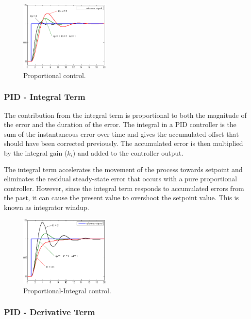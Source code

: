 \begin{figure}
\centering
\includegraphics[width=0.4\textwidth,height=\textheight]{ControlFigures/Change_with_Kp.png}
\caption{Proportional control.}
\end{figure}

\hypertarget{pid---integral-term}{%
\subsubsection{PID - Integral Term}\label{pid---integral-term}}

The contribution from the integral term is proportional to both the
magnitude of the error and the duration of the error. The integral in a
PID controller is the sum of the instantaneous error over time and gives
the accumulated offset that should have been corrected previously. The
accumulated error is then multiplied by the integral gain (\(k_i\)) and
added to the controller output.

The integral term accelerates the movement of the process towards
setpoint and eliminates the residual steady-state error that occurs with
a pure proportional controller. However, since the integral term
responds to accumulated errors from the past, it can cause the present
value to overshoot the setpoint value. This is known as integrator
windup.

\begin{figure}
\centering
\includegraphics[width=0.4\textwidth,height=\textheight]{ControlFigures/Change_with_Ki.png}
\caption{Proportional-Integral control.}
\end{figure}

\hypertarget{pid---derivative-term}{%
\subsubsection{PID - Derivative Term}\label{pid---derivative-term}}


